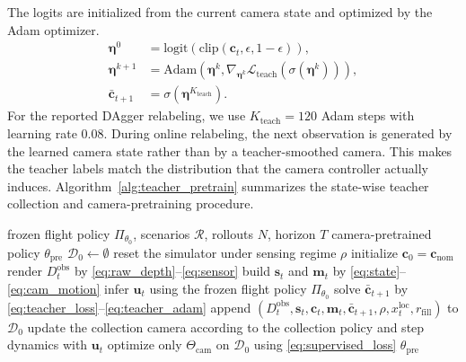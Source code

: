 \documentclass[letterpaper,journal]{IEEEtran}
\begin{document}
The logits are initialized from the current camera state and optimized by
the Adam optimizer.
\begin{equation}
\begin{aligned}
    \boldsymbol{\eta}^{0}
    &=\mathrm{logit}\!\left(\mathrm{clip}(\mathbf{c}_t,\epsilon,1-\epsilon)\right),\\
    \boldsymbol{\eta}^{k+1}
    &=\mathrm{Adam}\!\left(
    \boldsymbol{\eta}^{k},
    \nabla_{\boldsymbol{\eta}^{k}}
    \mathcal{L}_{\mathrm{teach}}(\sigma(\boldsymbol{\eta}^{k}))\right),\\
    \bar{\mathbf{c}}_{t+1}
    &=\sigma(\boldsymbol{\eta}^{K_{\mathrm{teach}}}).
    \label{eq:teacher_adam}
\end{aligned}
\end{equation}
For the reported DAgger relabeling, we use
$K_{\mathrm{teach}}=120$ Adam steps with learning rate $0.08$. During online
relabeling, the next observation is generated by the learned camera state
rather than by a teacher-smoothed camera. This makes the teacher labels match
the distribution that the camera controller actually induces.
Algorithm~\ref{alg:teacher_pretrain} summarizes the state-wise teacher
collection and camera-pretraining procedure.

\begin{algorithm}[t]
\caption{State-Wise Teacher Collection and Camera Pretraining}
\label{alg:teacher_pretrain}
\begin{algorithmic}[1]
\Require frozen flight policy $\Pi_{\theta_0}$, scenarios $\mathcal{R}$,
rollouts $N$, horizon $T$
\Ensure camera-pretrained policy $\theta_{\mathrm{pre}}$
\State $\mathcal{D}_{0}\gets\emptyset$
    \State reset the simulator under sensing regime $\rho$
    \State initialize $\mathbf{c}_0=\mathbf{c}_{\mathrm{nom}}$
      \State render $D_t^{\mathrm{obs}}$ by
      \eqref{eq:raw_depth}--\eqref{eq:sensor}
      \State build $\mathbf{s}_t$ and $\mathbf{m}_t$ by
      \eqref{eq:state}--\eqref{eq:cam_motion}
      \State infer $\mathbf{u}_t$ using the frozen flight policy
      $\Pi_{\theta_0}$
      \State solve $\bar{\mathbf{c}}_{t+1}$ by
      \eqref{eq:teacher_loss}--\eqref{eq:teacher_adam}
      \State append
      $(D_t^{\mathrm{obs}},\mathbf{s}_t,\mathbf{c}_t,\mathbf{m}_t,
      \bar{\mathbf{c}}_{t+1},\rho,x_t^{\mathrm{loc}},
      r_{\mathrm{fill}})$ to $\mathcal{D}_{0}$
      \State update the collection camera according to the collection policy
      and step dynamics with $\mathbf{u}_t$
    \EndFor
  \EndFor
\EndFor
\State optimize only $\Theta_{\mathrm{cam}}$ on $\mathcal{D}_{0}$ using
\eqref{eq:supervised_loss}
\State \Return $\theta_{\mathrm{pre}}$
\end{algorithmic}
\end{algorithm}
\end{document}
